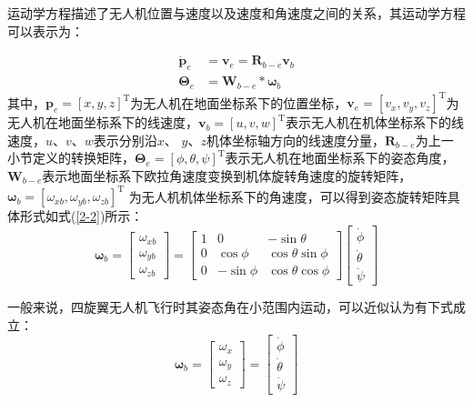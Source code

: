 \documentclass[lang=chs, degree=master, blindreview=true, winfonts=true]{yanputhesis}
\begin{document}
运动学方程描述了无人机位置与速度以及速度和角速度之间的关系，其运动学方程可以表示为：

\begin{equation}
    \begin{aligned}
	\dot{\boldsymbol{p}}_e &= \boldsymbol{v}_e = \bm{R}_{b-e} \bm{v}_b \\
	\bm{\Theta}_e &= \bm{W}_{b-e} * \bm{\omega}_b
\end{aligned}\label{2-1}
\end{equation}
其中，$\boldsymbol{p}_e=\left[x,y,z\right]^\mathrm{T}$为无人机在地面坐标系下的位置坐标，$\boldsymbol{v}_e=\left[v_{x},v_{y},v_{z}\right]^\mathrm{T}$为无人机在地面坐标系下的线速度，$\boldsymbol{v}_b=\left[u,v,w\right]^\mathrm{T}$表示无人机在机体坐标系下的线速度，$u$、$v$、$w$表示分别沿$x$、
$y$、$z$机体坐标轴方向的线速度分量，$\boldsymbol{R}_{b-e}$为上一小节定义的转换矩阵，$\bm{\Theta}_e=\left[\phi,\theta,\psi\right]^\mathrm{T}$表示无人机在地面坐标系下的姿态角度，$\bm{W}_{b-e}$表示地面坐标系下欧拉角速度变换到机体旋转角速度的旋转矩阵，$\boldsymbol{\omega}_b=\left[{\omega}_{xb},{\omega}_{yb},{\omega}_{zb}\right]^\mathrm{T}$ 为无人机机体坐标系下的角速度，可以得到姿态旋转矩阵具体形式如式(\ref{2-2})所示：
\begin{equation}
	\boldsymbol{\omega}_b=\begin{bmatrix}\omega_{xb}\\\omega_{yb}\\\omega_{zb}\end{bmatrix}=\begin{bmatrix}1&0&-\sin\theta\\0&\cos\phi&\cos\theta\sin\phi\\0&-\sin\phi&\cos\theta\cos\phi\end{bmatrix}\begin{bmatrix}\dot\phi\\\dot\theta\\\dot\psi\end{bmatrix}
	\label{2-2}
\end{equation}



一般来说，四旋翼无人机飞行时其姿态角在小范围内运动，可以近似认为有下式成立：
\begin{equation}
	\boldsymbol{\omega}_b=\begin{bmatrix}{\omega}_x\\{\omega}_y\\{\omega}_z\end{bmatrix}=\begin{bmatrix}\dot{\phi}\\\dot{\theta}\\\dot{\psi}\end{bmatrix}
	\label{2-3}
\end{equation}
\end{document}
